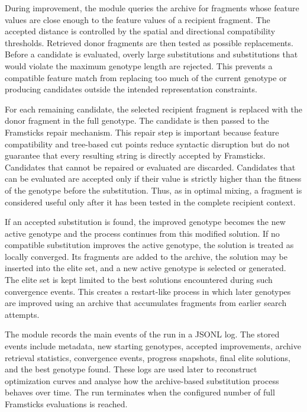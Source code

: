 During improvement, the module queries the archive for fragments whose feature values are close enough to the feature values of a recipient fragment. The accepted distance is controlled by the spatial and directional compatibility thresholds. Retrieved donor fragments are then tested as possible replacements. Before a candidate is evaluated, overly large substitutions and substitutions that would violate the maximum genotype length are rejected. This prevents a compatible feature match from replacing too much of the current genotype or producing candidates outside the intended representation constraints.

For each remaining candidate, the selected recipient fragment is replaced with the donor fragment in the full genotype. The candidate is then passed to the Framsticks repair mechanism. This repair step is important because feature compatibility and tree-based cut points reduce syntactic disruption but do not guarantee that every resulting string is directly accepted by Framsticks. Candidates that cannot be repaired or evaluated are discarded. Candidates that can be evaluated are accepted only if their \vertpos{} value is strictly higher than the fitness of the genotype before the substitution. Thus, as in optimal mixing, a fragment is considered useful only after it has been tested in the complete recipient context.

If an accepted substitution is found, the improved genotype becomes the new active genotype and the process continues from this modified solution. If no compatible substitution improves the active genotype, the solution is treated as locally converged. Its fragments are added to the archive, the solution may be inserted into the elite set, and a new active genotype is selected or generated. The elite set is kept limited to the best solutions encountered during such convergence events. This creates a restart-like process in which later genotypes are improved using an archive that accumulates fragments from earlier search attempts.

The module records the main events of the run in a JSONL log. The stored events include metadata, new starting genotypes, accepted improvements, archive retrieval statistics, convergence events, progress snapshots, final elite solutions, and the best genotype found. These logs are used later to reconstruct optimization curves and analyse how the archive-based substitution process behaves over time. The run terminates when the configured number of full Framsticks evaluations is reached.

